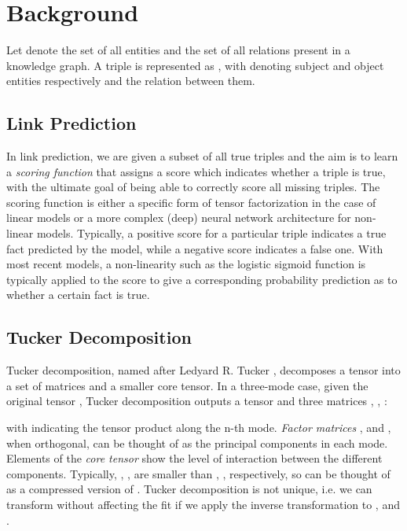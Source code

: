 \documentclass[11pt,a4paper]{article}
\begin{document}
\section{Background}

Let  denote the set of all entities and  the set of all relations present in a knowledge graph. A triple is represented as , with  denoting subject and object entities respectively and  the relation between them. 

\subsection{Link Prediction}

In link prediction, we are given a subset of all true triples and the aim is to learn a \textit{scoring function}  that assigns a score  which indicates whether a triple is true, with the ultimate goal of being able to correctly score all missing triples. The scoring function is either a specific form of tensor factorization in the case of linear models or a more complex (deep) neural network architecture for non-linear models. Typically, a positive score for a particular triple indicates a true fact predicted by the model, while a negative score indicates a false one. With most recent models, a non-linearity such as the logistic sigmoid function is typically applied to the score to give a corresponding probability prediction  as to whether a certain fact is true. 

 
 \subsection{Tucker Decomposition} \label{tuckerdecomp}
 
Tucker decomposition, named after Ledyard R. Tucker \cite{tucker1964extension}, decomposes a tensor into a set of matrices and a smaller core tensor. In a three-mode case, given the original tensor , Tucker decomposition outputs a tensor  and three matrices , , :

with  indicating the tensor product along the n-th mode. \textit{Factor matrices} ,  and , when orthogonal, can be thought of as the principal components in each mode. Elements of the \textit{core tensor}  show the level of interaction between the different components. Typically, , ,  are smaller than , ,  respectively, so  can be thought of as a compressed version of . 
Tucker decomposition is not unique, i.e. we can transform  without affecting the fit if we apply the inverse transformation to ,  and  \cite{kolda2009tensor}. 
 
\end{document}
